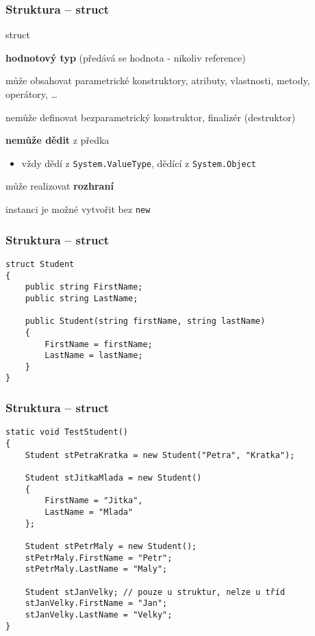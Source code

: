 


\begin{frame}[fragile]
\frametitle{Struktura -- struct}
\begin{bitemize}{struct}
\item \textbf{hodnotový typ} (předává se hodnota - nikoliv reference)
\item může obsahovat parametrické konstruktory, atributy, vlastnosti, metody, operátory, \ldots
\item nemůže definovat bezparametrický konstruktor, finalizér (destruktor)
\item \textbf{nemůže dědit} z předka
\begin{itemize}
\item vždy dědí z \lstinline|System.ValueType|, dědící z \lstinline|System.Object|
\end{itemize}
\item může realizovat \textbf{rozhraní}
\item instanci je možné vytvořit bez \lstinline|new|
\end{bitemize}
\end{frame}

\begin{frame}[fragile]
\frametitle{Struktura -- struct}
\begin{yesblock}
\begin{lstlisting}
struct Student
{
    public string FirstName;
    public string LastName;

    public Student(string firstName, string lastName)
    {
        FirstName = firstName;
        LastName = lastName;
    }
}
\end{lstlisting}
\end{yesblock}
\end{frame}

\begin{frame}[fragile]
\frametitle{Struktura -- struct}
\begin{yesblock}
\begin{lstlisting}[basicstyle=\small]
static void TestStudent()
{
    Student stPetraKratka = new Student("Petra", "Kratka");

    Student stJitkaMlada = new Student()
    {
        FirstName = "Jitka",
        LastName = "Mlada"
    };

    Student stPetrMaly = new Student();
    stPetrMaly.FirstName = "Petr";
    stPetrMaly.LastName = "Maly";

    Student stJanVelky; // pouze u struktur, nelze u tříd
    stJanVelky.FirstName = "Jan";
    stJanVelky.LastName = "Velky";
}
\end{lstlisting}
\end{yesblock}
\end{frame}


